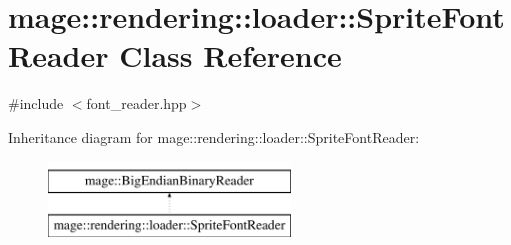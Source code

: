 \hypertarget{classmage_1_1rendering_1_1loader_1_1_sprite_font_reader}{}\section{mage\+:\+:rendering\+:\+:loader\+:\+:Sprite\+Font\+Reader Class Reference}
\label{classmage_1_1rendering_1_1loader_1_1_sprite_font_reader}


{\ttfamily \#include $<$font\+\_\+reader.\+hpp$>$}

Inheritance diagram for mage\+:\+:rendering\+:\+:loader\+:\+:Sprite\+Font\+Reader\+:\begin{figure}[H]
\begin{center}
\leavevmode
\includegraphics[height=2.000000cm]{classmage_1_1rendering_1_1loader_1_1_sprite_font_reader}
\end{center}
\end{figure}
